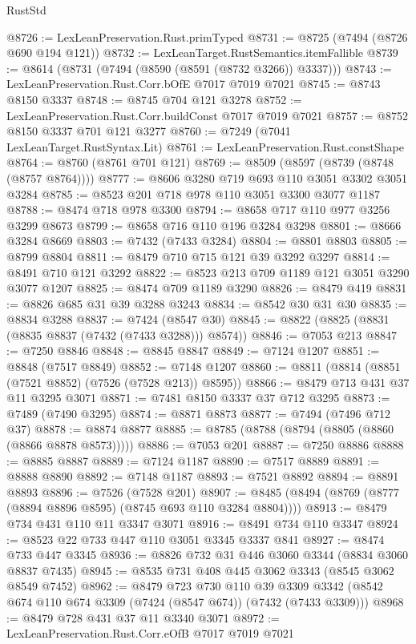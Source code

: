 \begin{lexlean}{RustStd}
\begin{coremodule}
@8726 := LexLeanPreservation.Rust.primTyped
@8731 := @8725 (@7494 (@8726 @690 @194 @121))
@8732 := LexLeanTarget.RustSemantics.itemFallible
@8739 := @8614 (@8731 (@7494 (@8590 (@8591 (@8732 @3266)) @3337)))
@8743 := LexLeanPreservation.Rust.Corr.bOfE @7017 @7019 @7021
@8745 := @8743 @8150 @3337
@8748 := @8745 @704 @121 @3278
@8752 := LexLeanPreservation.Rust.Corr.buildConst @7017 @7019 @7021
@8757 := @8752 @8150 @3337 @701 @121 @3277
@8760 := @7249 (@7041 LexLeanTarget.RustSyntax.Lit)
@8761 := LexLeanPreservation.Rust.constShape
@8764 := @8760 (@8761 @701 @121)
@8769 := @8509 (@8597 (@8739 (@8748 (@8757 @8764))))
@8777 := @8606 @3280 @719 @693 @110 @3051 @3302 @3051 @3284
@8785 := @8523 @201 @718 @978 @110 @3051 @3300 @3077 @1187
@8788 := @8474 @718 @978 @3300
@8794 := @8658 @717 @110 @977 @3256 @3299 @8673
@8799 := @8658 @716 @110 @196 @3284 @3298
@8801 := @8666 @3284 @8669
@8803 := @7432 (@7433 @3284)
@8804 := @8801 @8803
@8805 := @8799 @8804
@8811 := @8479 @710 @715 @121 @39 @3292 @3297
@8814 := @8491 @710 @121 @3292
@8822 := @8523 @213 @709 @1189 @121 @3051 @3290 @3077 @1207
@8825 := @8474 @709 @1189 @3290
@8826 := @8479 @419
@8831 := @8826 @685 @31 @39 @3288 @3243
@8834 := @8542 @30 @31 @30
@8835 := @8834 @3288
@8837 := @7424 (@8547 @30)
@8845 := @8822 (@8825 (@8831 (@8835 @8837 (@7432 (@7433 @3288))) @8574))
@8846 := @7053 @213
@8847 := @7250 @8846
@8848 := @8845 @8847
@8849 := @7124 @1207
@8851 := @8848 (@7517 @8849)
@8852 := @7148 @1207
@8860 := @8811 (@8814 (@8851 (@7521 @8852) (@7526 (@7528 @213)) @8595))
@8866 := @8479 @713 @431 @37 @11 @3295 @3071
@8871 := @7481 @8150 @3337 @37 @712 @3295
@8873 := @7489 (@7490 @3295)
@8874 := @8871 @8873
@8877 := @7494 (@7496 @712 @37)
@8878 := @8874 @8877
@8885 := @8785 (@8788 (@8794 (@8805 (@8860 (@8866 @8878 @8573)))))
@8886 := @7053 @201
@8887 := @7250 @8886
@8888 := @8885 @8887
@8889 := @7124 @1187
@8890 := @7517 @8889
@8891 := @8888 @8890
@8892 := @7148 @1187
@8893 := @7521 @8892
@8894 := @8891 @8893
@8896 := @7526 (@7528 @201)
@8907 := @8485 (@8494 (@8769 (@8777 (@8894 @8896 @8595) (@8745 @693 @110 @3284 @8804))))
@8913 := @8479 @734 @431 @110 @11 @3347 @3071
@8916 := @8491 @734 @110 @3347
@8924 := @8523 @22 @733 @447 @110 @3051 @3345 @3337 @841
@8927 := @8474 @733 @447 @3345
@8936 := @8826 @732 @31 @446 @3060 @3344 (@8834 @3060 @8837 @7435)
@8945 := @8535 @731 @408 @445 @3062 @3343 (@8545 @3062 @8549 @7452)
@8962 := @8479
    @723
    @730
    @110
    @39
    @3309
    @3342
    (@8542 @674 @110 @674 @3309 (@7424 (@8547 @674)) (@7432 (@7433 @3309)))
@8968 := @8479 @728 @431 @37 @11 @3340 @3071
@8972 := LexLeanPreservation.Rust.Corr.eOfB @7017 @7019 @7021

\end{coremodule}
\end{lexlean}
